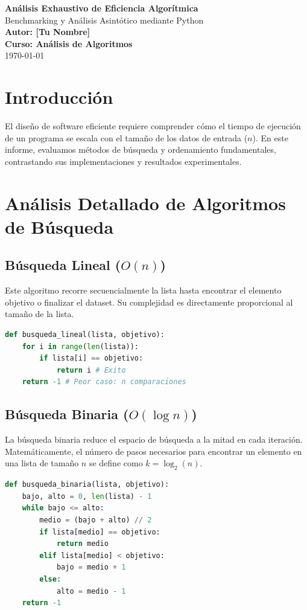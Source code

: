 \documentclass[12pt,a4paper]{article}
\begin{document}
\begin{titlepage}
    \centering
    \vspace*{1cm}
    \Huge \textbf{Análisis Exhaustivo de Eficiencia Algorítmica} \\
    \vspace{0.5cm}
    \LARGE Benchmarking y Análisis Asintótico mediante Python \\
    \vspace{2cm}
    \textbf{Autor: [Tu Nombre]} \\
    \vspace{0.5cm}
    \textbf{Curso: Análisis de Algoritmos} \\
    \vfill
    \Large \today
\end{titlepage}

\tableofcontents
\newpage

\section{Introducción}
El diseño de software eficiente requiere comprender cómo el tiempo de ejecución de un programa se escala con el tamaño de los datos de entrada ($n$). En este informe, evaluamos métodos de búsqueda y ordenamiento fundamentales, contrastando sus implementaciones y resultados experimentales.

\section{Análisis Detallado de Algoritmos de Búsqueda}

\subsection{Búsqueda Lineal ($O(n)$)}
Este algoritmo recorre secuencialmente la lista hasta encontrar el elemento objetivo o finalizar el dataset. Su complejidad es directamente proporcional al tamaño de la lista.
\begin{lstlisting}[language=Python, caption=Implementación de Búsqueda Lineal]
def busqueda_lineal(lista, objetivo):
    for i in range(len(lista)):
        if lista[i] == objetivo:
            return i # Exito
    return -1 # Peor caso: n comparaciones
\end{lstlisting}

\subsection{Búsqueda Binaria ($O(\log n)$)}
La búsqueda binaria reduce el espacio de búsqueda a la mitad en cada iteración. Matemáticamente, el número de pasos necesarios para encontrar un elemento en una lista de tamaño $n$ se define como $k = \log_2(n)$.
\begin{lstlisting}[language=Python, caption=Implementación de Búsqueda Binaria]
def busqueda_binaria(lista, objetivo):
    bajo, alto = 0, len(lista) - 1
    while bajo <= alto:
        medio = (bajo + alto) // 2
        if lista[medio] == objetivo:
            return medio
        elif lista[medio] < objetivo:
            bajo = medio + 1
        else:
            alto = medio - 1
    return -1
\end{lstlisting}
\end{document}
